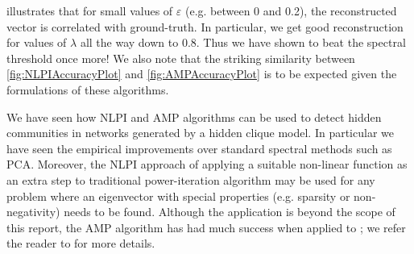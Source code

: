  illustrates that for small values of $\varepsilon$ (e.g. between 0 and 0.2), the reconstructed vector is correlated with ground-truth.
In particular, we get good reconstruction for values of $\lambda$ all the way down to 0.8. Thus we have shown to beat the spectral threshold once more!
We also note that the striking similarity between \cref{fig:NLPIAccuracyPlot} and \cref{fig:AMPAccuracyPlot} is to be expected given the formulations of these algorithms.

We have seen how NLPI and AMP algorithms can be used to detect hidden communities in networks generated by a hidden clique model.
In particular we have seen the empirical improvements over standard spectral methods such as PCA.
Moreover, the NLPI approach of applying a suitable non-linear function as an extra step to traditional power-iteration algorithm may be used for any problem where an eigenvector with special properties (e.g. sparsity or non-negativity) needs to be found.
Although the application is beyond the scope of this report, the AMP algorithm has had much success when applied to ; we refer the reader to \cite{DMM09,MDM10,BM11,Mon11,BKS13} for more details. 